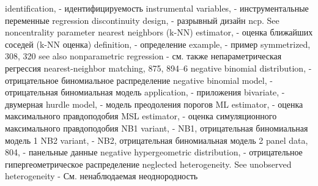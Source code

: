 identification, - идентифицируемость
instrumental variables, - инструментальные переменные
regression discontinuity design, - разрывный дизайн 
ncp. See noncentrality parameter
nearest neighbors (k-NN) estimator, - оценка ближайших соседей (k-NN оценка)
definition, - определение
example, - пример
symmetrized, 308, 320
see also nonparametric regression - см. также непараметрическая регрессия
nearest-neighbor matching, 875, 894–6 
negative binomial distribution, - отрицательное биномиальное распределение
negative binomial model, - отрицательная биномиальная модель
application, - приложения 
bivariate, - двумерная
hurdle model, - модель преодоления порогов
ML estimator, - оценка максимального правдоподобия
MSL estimator, - оценка симуляционного максимального правдоподобия 
NB1 variant, - NB1, отрицательная биномиальная модель 1
NB2 variant, - NB2, отрицательная биномиальная модель 2
panel data, 804, - панельные данные
negative hypergeometric distribution, - отрицательное гипергеометрическое распределение 
neglected heterogeneity. See unobserved heterogeneity - См. ненаблюдаемая неоднородность

